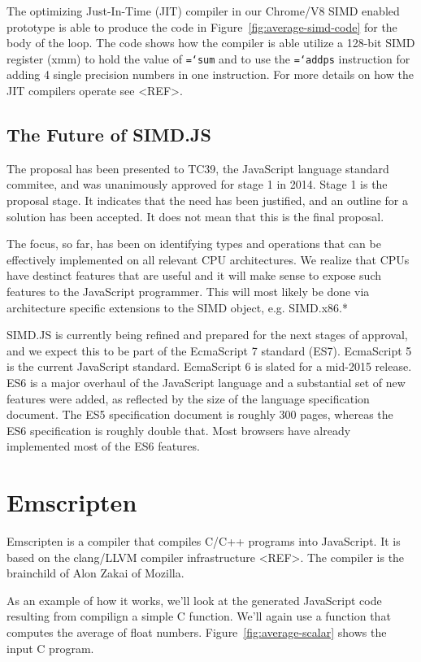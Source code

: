 \documentclass[preprint]{sigplanconf}
\newcommand{\ttt}[1]{{\texttt{\hyphenchar\font=`\-\relax #1}}}%
\begin{document}
The optimizing Just-In-Time (JIT) compiler in our Chrome/V8 SIMD enabled
prototype is able to produce the code in Figure~\ref{fig:average-simd-code} for
the body of the loop.  The code shows how the compiler is able utilize a
128-bit SIMD register (xmm) to hold the value of \ttt{sum} and to use the
\ttt{addps} instruction for adding 4 single precision numbers in one
instruction.  For more details on how the JIT compilers operate see <REF>.

\subsection{The Future of SIMD.JS}

The proposal has been presented to TC39, the JavaScript language standard
commitee, and was unanimously approved for stage 1 in 2014.  Stage 1 is the
proposal stage.  It indicates that the need has been justified, and an 
outline for a solution has been accepted.  It does not mean that this is the final
proposal.

The focus, so far, has been on identifying types and operations that can be
effectively implemented on all relevant CPU architectures.  We realize that CPUs
have destinct features that are useful and it will make sense to expose such 
features to the JavaScript programmer.  This will most likely be done via
architecture specific extensions to the SIMD object, e.g. SIMD.x86.*

SIMD.JS is currently being refined and prepared for the next stages of approval,
and we expect this to be part of the EcmaScript 7 standard (ES7).
EcmaScript 5 is the current JavaScript standard.  EcmaScript 6 is slated for a
mid-2015 release. ES6 is a major overhaul of the JavaScript language and a 
substantial set of new features were added, as reflected by the size of the 
language specification document.  The ES5 specification document is roughly 300 
pages, whereas the ES6 specification is roughly double that. Most browsers 
have already implemented most of the ES6 features.

\section{Emscripten}

Emscripten is a compiler that compiles C/C++ programs into JavaScript.  It is
based on the clang/LLVM compiler infrastructure <REF>.  The compiler is the
brainchild of Alon Zakai of Mozilla.

As an example of how it works, we'll look at the generated JavaScript code
resulting from compilign a simple C function.  We'll again use a function that
computes the average of float numbers.  Figure~\ref{fig:average-scalar} shows
the input C program.
\end{document}
